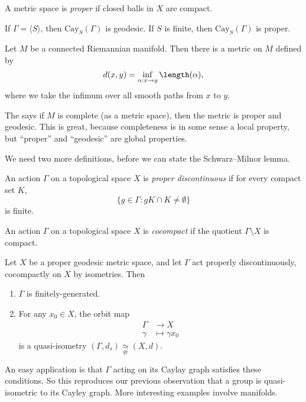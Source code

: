 \documentclass[a4paper]{article}
\newcommand\Cay{\mathrm{Cay}}
\newcommand{\qi}{\underset{qi}{\simeq}}
\begin{document}
\begin{defi}
  A metric space is \emph{proper} if closed balls in $X$ are compact.
\end{defi}

\begin{eg}
  If $\Gamma = \langle S\rangle$, then $\Cay_S(\Gamma)$ is geodesic. If $S$ is finite, then $\Cay_S(\Gamma)$ is proper.
\end{eg}

\begin{eg}
  Let $M$ be a connected Riemannian manifold. Then there is a metric on $M$ defined by
  \[
    d(x, y) = \inf_{\alpha: x \to y} \length(\alpha),
  \]
  where we take the infimum over all smooth paths from $x$ to $y$.

  The  says if $M$ is complete (as a metric space), then the metric is proper and geodesic. This is great, because completeness is in some sense a local property, but ``proper'' and ``geodesic'' are global properties.
\end{eg}

We need two more definitions, before we can state the Schwarz--Milnor lemma.
\begin{defi}
  An action $\Gamma$ on a topological space $X$ is \emph{proper discontinuous} if for every compact set $K$,
  \[
    \{g \in \Gamma: gK \cap K \not= \emptyset\}
  \]
  is finite.
\end{defi}

\begin{defi}
  An action $\Gamma$ on a topological space $X$ is \emph{cocompact} if the quotient $\Gamma \setminus X$ is compact.
\end{defi}

\begin{lemma}
  Let $X$ be a proper geodesic metric space, and let $\Gamma$ act properly discontinuously, cocompactly on $X$ by isometries. Then
  \begin{enumerate}
    \item $\Gamma$ is finitely-generated.
    \item For any $x_0 \in X$, the orbit map
      \begin{align*}
        \Gamma &\to X\\
        \gamma &\mapsto \gamma x_0
      \end{align*}
      is a quasi-isometry $(\Gamma, d_s) \qi (X, d)$.
  \end{enumerate}
\end{lemma}
An easy application is that $\Gamma$ acting on its Caylay graph satisfies these conditions. So this reproduces our previous observation that a group is quasi-isometric to its Cayley graph. More interesting examples involve manifolds.
\end{document}
